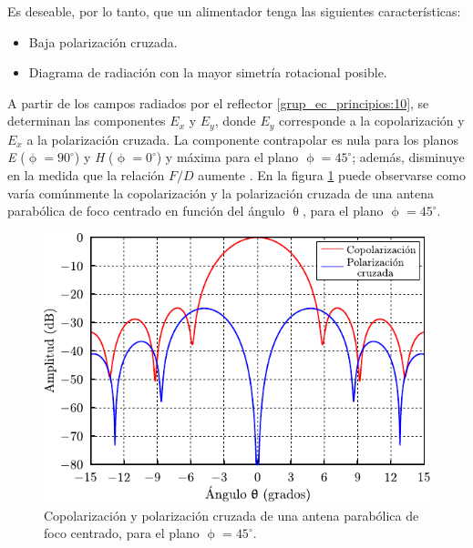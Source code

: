 Es deseable, por lo tanto, que un alimentador tenga las siguientes características:
\begin{itemize}
\item Baja polarización cruzada.
\item Diagrama de radiación con la mayor simetría rotacional posible.
\end{itemize}
A partir de los campos radiados por el reflector \eqref{grup_ec_principios:10}, se determinan las componentes $E_x$ y $E_y$, donde $E_y$ corresponde a la copolarización y $E_x$ a la polarización cruzada. La componente contrapolar es nula para los planos \emph{E} ($\upphi = 90^{\circ}$) y \emph{H} ($\upphi = 0^{\circ}$) y máxima para el plano $\upphi = 45^{\circ}$; además, disminuye en la medida que la relación $F/D$ aumente \cite{Stutzman} \cite{Collin}. En la figura \ref{fig_principios:12} puede observarse como varía comúnmente la copolarización y la polarización cruzada de una antena parabólica de foco centrado en función del ángulo $\uptheta$, para el plano $\upphi = 45^{\circ}$.
\begin{figure}[H]
\centering
\includegraphics[scale = 1]{Figures/Principios/principios_12}
\caption{Copolarización y polarización cruzada de una antena parabólica de foco centrado, para el plano $\upphi = 45^{\circ}$.}
\label{fig_principios:12}
\end{figure}
